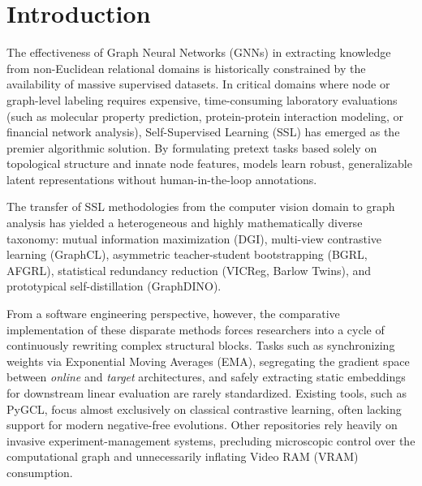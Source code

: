 \documentclass[conference]{IEEEtran}
\begin{document}
\section{Introduction}
The effectiveness of Graph Neural Networks (GNNs) in extracting knowledge from non-Euclidean relational domains is historically constrained by the availability of massive supervised datasets. In critical domains where node or graph-level labeling requires expensive, time-consuming laboratory evaluations (such as molecular property prediction, protein-protein interaction modeling, or financial network analysis), Self-Supervised Learning (SSL) has emerged as the premier algorithmic solution. By formulating pretext tasks based solely on topological structure and innate node features, models learn robust, generalizable latent representations without human-in-the-loop annotations.

The transfer of SSL methodologies from the computer vision domain to graph analysis has yielded a heterogeneous and highly mathematically diverse taxonomy: mutual information maximization (DGI), multi-view contrastive learning (GraphCL), asymmetric teacher-student bootstrapping (BGRL, AFGRL), statistical redundancy reduction (VICReg, Barlow Twins), and prototypical self-distillation (GraphDINO). 

From a software engineering perspective, however, the comparative implementation of these disparate methods forces researchers into a cycle of continuously rewriting complex structural blocks. Tasks such as synchronizing weights via Exponential Moving Averages (EMA), segregating the gradient space between \textit{online} and \textit{target} architectures, and safely extracting static embeddings for downstream linear evaluation are rarely standardized. Existing tools, such as PyGCL, focus almost exclusively on classical contrastive learning, often lacking support for modern negative-free evolutions. Other repositories rely heavily on invasive experiment-management systems, precluding microscopic control over the computational graph and unnecessarily inflating Video RAM (VRAM) consumption.
\end{document}
